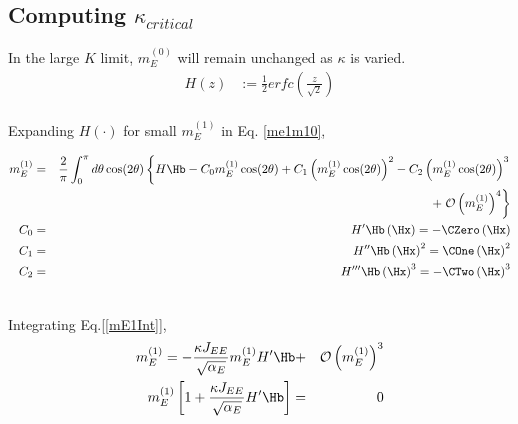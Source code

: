 \subsection{Computing $\kappa_{critical}$}
In the large $K$ limit, $m_E^{(0)}$ will remain unchanged as $\kappa$ is varied.
\begin{eqnarray}
H(z) &:= \frac{1}{2}  erfc\left(\frac{z}{\sqrt{2}} \right) 
\end{eqnarray}
\\
Expanding $H(\cdot)$ for small $m_E^{(1)}$ in Eq. \ref{me1m10}, %
\begin{widetext}
\begin{eqnarray}
\label{mE1Int}
m_E^{(1)} =&& \frac{2}{\pi} \int_0^\pi d\theta \cos(2\theta) \left\lbrace H \Hb - C_0 m_E^{(1)} \cos(2\theta)  +  C_1 \left( m_E^{(1)} \cos(2\theta) \right)^2  - C_2  \left( m_E^{(1)} \cos(2\theta) \right)^3 \right. \nonumber \\
&&\qquad \qquad \qquad \qquad\qquad\qquad\qquad\quad+ \left.  \mathcal{O} \left( m_E^{(1)} \right)^4 \right\rbrace \\
C_0 =&& H^{\prime}\Hb  \left( \Hx \right) =  -\CZero  \left( \Hx \right) \\ 
C_1 =&&  H^{\prime \prime}\Hb  \left( \Hx \right)^2 = \COne \left( \Hx \right)^2 \\ 
C_2 =&& H^{\prime \prime \prime}\Hb  \left( \Hx \right)^3 = -\CTwo \left( \Hx \right)^3
\end{eqnarray}
\end{widetext} \\

Integrating Eq.[\ref{mE1Int}], \\
\begin{eqnarray}
m_E^{(1)} = -\frac{\kappa J_{EE}} {\sqrt{\alpha_E}} m_E^{(1)} H^{\prime} \Hb +&& \mathcal{O} \left( m_E^{(1)} \right)^3 \label{me1Sol} \\
m_E^{(1)} \left[1 + \frac{\kappa J_{EE}} {\sqrt{\alpha_E}} H^{\prime} \Hb \right] =&& 0 
\end{eqnarray}

